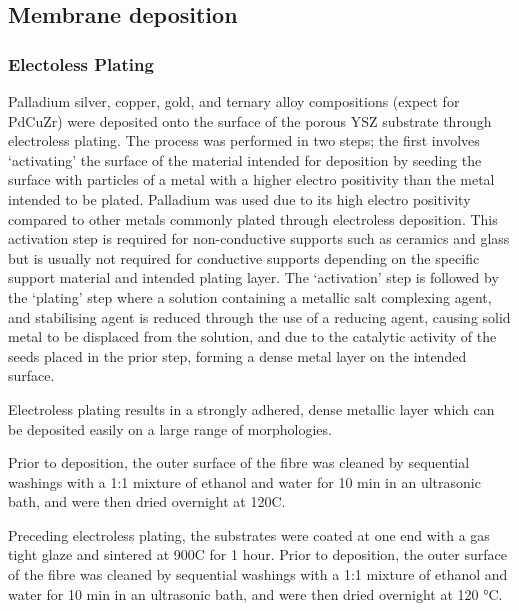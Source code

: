 \subsection{Membrane deposition}
\subsubsection{Electoless Plating}
Palladium silver, copper, gold, and ternary alloy compositions (expect for PdCuZr) were deposited onto the surface of the porous YSZ substrate through electroless plating. The process was performed in two steps; the first involves ‘activating’ the surface of the material intended for deposition by seeding the surface with particles of a metal with a 
higher electro positivity than the metal intended to be plated. Palladium was used due to its high electro positivity compared to other metals commonly plated through electroless deposition. This activation step is required for non-conductive supports such as ceramics and glass but is usually not required for conductive supports depending on the specific support material and intended plating layer. The ‘activation’ step is followed by the ‘plating’ step where a solution containing a metallic salt complexing agent, and stabilising agent is reduced through the use of a reducing agent, causing solid metal to be displaced from the 
solution, and due to the catalytic activity of the seeds placed in the prior step, forming a dense metal layer on the intended surface. 

Electroless plating results in a strongly adhered, dense metallic layer which can be deposited easily on a large range of morphologies.

Prior to deposition, the outer surface of the fibre was cleaned by sequential washings with a 1:1 mixture of ethanol and water for 10 min in an ultrasonic bath, and were then dried overnight at 120\textdegree C.

Preceding electroless plating, the substrates were coated at one end with a gas tight glaze and sintered at 900\textdegree C for 1 hour. Prior to deposition, the outer surface of the fibre was cleaned by sequential washings with a 1:1 mixture of ethanol and water for 10 min in an 
ultrasonic bath, and were then dried overnight at 120 °C.

